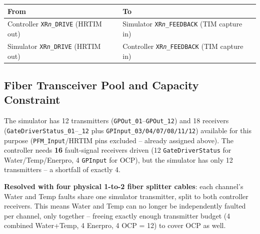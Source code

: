 \documentclass[11pt]{article}
\newcommand{\code}[1]{\texttt{#1}}
\begin{document}
\begin{center}
\begin{tabular}{p{2.2in} p{2.2in}}
  \hline
  \textbf{From} & \textbf{To} \\
  \hline
  Controller \code{XR\emph{n}\_DRIVE} (HRTIM out) & Simulator
    \code{XR\emph{n}\_FEEDBACK} (TIM capture in) \\
  Simulator \code{XR\emph{n}\_DRIVE} (HRTIM out) & Controller
    \code{XR\emph{n}\_FEEDBACK} (TIM capture in) \\
  \hline
\end{tabular}
\end{center}

\subsection{Fiber Transceiver Pool and Capacity Constraint}

The simulator has 12 transmitters (\code{GPOut\_01}--\code{GPOut\_12})
and 18 receivers (\code{GateDriverStatus\_01}--\code{\_12} plus
\code{GPInput\_03/04/07/08/11/12}) available for this purpose
(\code{PFM\_Input}/HRTIM pins excluded -- already assigned above). The
controller needs \textbf{16} fault-signal receivers driven (12
\code{GateDriverStatus} for Water/Temp/Enerpro, 4 \code{GPInput} for
OCP), but the simulator has only 12 transmitters -- a shortfall of
exactly 4.

\textbf{Resolved with four physical 1-to-2 fiber splitter cables}: each
channel's Water and Temp faults share one simulator transmitter, split
to both controller receivers. This means Water and Temp can no longer
be independently faulted per channel, only together -- freeing exactly
enough transmitter budget (4 combined Water+Temp, 4 Enerpro, 4 OCP =
12) to cover OCP as well.
\end{document}
